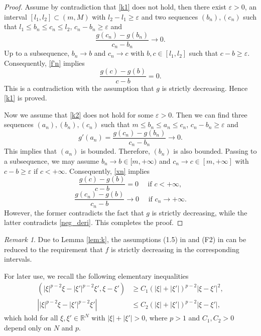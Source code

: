 \documentclass[reqno]{amsart}
\theoremstyle{plain}
\theoremstyle{definition}
\theoremstyle{remark}
\newtheorem{remark}{Remark}
\begin{document}
	\begin{proof}
		Assume by contradiction that \eqref{k1} does not hold, then there exist $\varepsilon>0$, an interval $[l_1,l_2] \subset (m,M)$ with $l_2-l_1\ge\varepsilon$ and two sequences $(b_n),(c_n)$ such that $l_1\le b_n\le c_n\le l_2$, $c_n-b_n\ge\varepsilon$ and
		\begin{equation}\label{f'n}
			\frac{g(c_n)-g(b_n)}{c_n-b_n} \to 0.
		\end{equation}
		Up to a subsequence, $b_n\to b$ and $c_n\to c$ with $b,c\in[l_1,l_2]$ such that $c-b\ge\varepsilon$. Consequently, \eqref{f'n} implies
		\[
		\frac{g(c)-g(b)}{c-b} = 0.
		\]
		This is a contradiction with the assumption that $g$ is strictly decreasing. Hence \eqref{k1} is proved.
		
		Now we assume that \eqref{k2} does not hold for some $\varepsilon>0$. Then we can find three sequences $(a_n),(b_n),(c_n)$ such that $m\le b_n\le a_n\le c_n$, $c_n-b_n\ge\varepsilon$ and
		\begin{equation}\label{xn}
			g'(a_n) = \frac{g(c_n)-g(b_n)}{c_n-b_n} \to 0.
		\end{equation}
		This implies that $(a_n)$ is bounded. Therefore, $(b_n)$ is also bounded. Passing to a subsequence, we may assume $b_n\to b \in[m,+\infty)$ and $c_n\to c \in[m,+\infty]$ with $c-b\ge \varepsilon$ if $c<+\infty$. Consequently, \eqref{xn} implies
		\[
		\frac{g(c)-g(b)}{c-b} = 0 \quad\text{ if } c<+\infty,
		\]
		\[
		\frac{g(c_n)-g(b)}{c_n-b} \to 0 \quad\text{ if } c_n\to+\infty.
		\]
		However, the former contradicts the fact that $g$ is strictly decreasing, while the latter contradicts \eqref{neg_deri}. This completes the proof.
	\end{proof}
	
	\begin{remark}
		Due to Lemma \ref{lem:k}, the assumptions (1.5) in \cite{MR4635360} and (F2) in \cite{MR4771444} can be reduced to the requirement that $f$ is strictly decreasing in the corresponding intervals.
	\end{remark}
	
	For later use, we recall the following elementary inequalities
	\begin{align}
		(|\xi|^{p-2}\xi - |\xi'|^{p-2}\xi', \xi -\xi') &\ge C_1 (|\xi| + |\xi'|)^{p-2} |\xi -\xi'|^2, \label{p_ge}\\
		\left||\xi|^{p-2}\xi - |\xi'|^{p-2}\xi'\right| &\le C_2 (|\xi| + |\xi'|)^{p-2} |\xi -\xi'|, \label{p_le}
	\end{align}
	which hold for all $\xi, \xi' \in\mathbb{R}^N$ with $|\xi|+|\xi'|>0$, where $p>1$ and $C_1,C_2>0$ depend only on $N$ and $p$.
	
\end{document}
